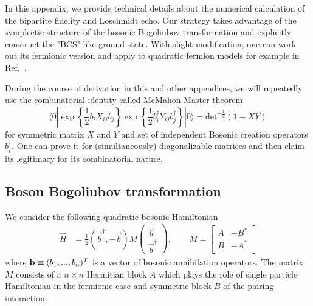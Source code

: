 
In this appendix, we provide technical details about the numerical calculation of the bipartite fidelity and Loschmidt echo.  Our strategy takes advantage of the symplectic structure of the bosonic Bogoliubov transformation and explicitly construct the "BCS" like ground state. With slight modification\cite{blaizot_quantum_1986}, one can work out its fermionic version and apply to quadratic fermion models for example in Ref.~.

During the course of derivation in this and other appendices, we will repeatedly use the combinatorial identity called McMahon Master theorem
\begin{equation}
\label{eq:bosonic_McMahon}
\langle0|\exp\left\{\frac{1}{2}b_iX_{ij}b_j\right\}\exp\left\{\frac{1}{2}b^\dagger_iY_{ij}b^\dagger_j\right\}|0\rangle=\text{det}^{-\frac{1}{2}}(1-XY)
\end{equation}
for symmetric matrix $X$ and $Y$ and set of independent Bosonic creation operators $b_i^{\dagger}$. One can prove it for (simultaneously) diagonalizable matrices and then claim its legitimacy for its combinatorial nature. 

\subsection{Boson Bogoliubov transformation}
\label{app_sub:boson_BdG}
We consider the following quadratic bosonic Hamiltonian
\begin{equation}
\begin{aligned}
\label{eq:quadratic_boson_H}
\hat{H} &= \frac{1}{2} (\vec{b}^{\dagger}, -\vec{b}) M 
\begin{pmatrix}
\vec{b}\\
\vec{b}^{\dagger} 
\end{pmatrix},  \qquad 
M = 
\begin{bmatrix}
A & -B^* \\
B & -A^* \\
\end{bmatrix}
\end{aligned}
\end{equation}
where ${\bf b}\equiv(b_{1},...,b_{n})^T$ is a vector of bosonic annihilation operators. The matrix $M$ consists of a $n\times n$ Hermitian block $A$ which plays the role of single particle Hamiltonian in the fermionic case and symmetric block $B$ of the pairing interaction. 

